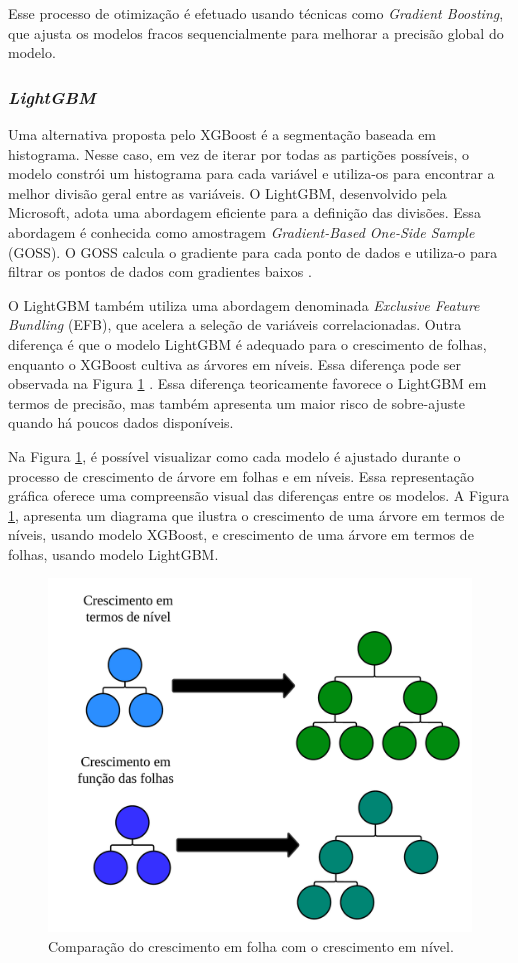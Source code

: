 Esse processo de otimização é efetuado usando técnicas como \textit{Gradient Boosting}, que ajusta os modelos fracos sequencialmente para melhorar a precisão global do modelo.
 

 
 \subsubsection{\textit{LightGBM}}
 
 Uma alternativa proposta pelo XGBoost é a segmentação baseada em histograma. Nesse caso, em vez de iterar por todas as partições possíveis, o modelo constrói um histograma para cada variável e utiliza-os para encontrar a melhor divisão geral entre as variáveis. O LightGBM, desenvolvido pela Microsoft, adota uma abordagem eficiente para a definição das divisões. Essa abordagem é conhecida como amostragem \textit{Gradient-Based One-Side Sample} (GOSS). O GOSS calcula o gradiente para cada ponto de dados e utiliza-o para filtrar os pontos de dados com gradientes baixos \cite{SUN2020101084}. 
 
 O LightGBM também utiliza uma abordagem denominada \textit{Exclusive Feature Bundling} (EFB), que acelera a seleção de variáveis correlacionadas. 
 Outra diferença é que o modelo LightGBM é adequado para o crescimento de folhas, enquanto o XGBoost cultiva as árvores em níveis. Essa diferença pode ser observada na Figura \ref{fig:xgboost} \cite{YE2023407}. Essa diferença teoricamente favorece o LightGBM em termos de precisão, mas também apresenta um maior risco de sobre-ajuste quando há poucos dados disponíveis. 
 
 Na Figura \ref{fig:xgboost}, é possível visualizar como cada modelo é ajustado durante o processo de crescimento de árvore em folhas e em níveis. Essa representação gráfica oferece uma compreensão visual das diferenças entre os modelos. A Figura \ref{fig:xgboost}, apresenta um diagrama que ilustra o crescimento de uma árvore em termos de níveis, usando modelo XGBoost, e crescimento de uma árvore em termos de folhas, usando modelo LightGBM.
 
 \begin{figure}[!htb]
 	\centering
 	\caption{Comparação do crescimento em folha com o crescimento em nível.}
 	\label{fig:xgboost}
 	\includegraphics[width=0.7\linewidth]{Modelos/Figuras/xgboost.pdf}
 \end{figure}
 

